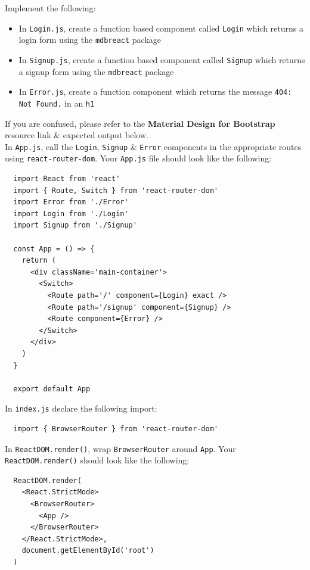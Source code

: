 \documentclass{article}
\begin{document}
Implement the following:
\begin{itemize}
  \item In \texttt{Login.js}, create a function based component called \texttt{Login} which returns a login form using the \texttt{mdbreact} package
  \item In \texttt{Signup.js}, create a function based component called \texttt{Signup} which returns a signup form using the \texttt{mdbreact} package
  \item In \texttt{Error.js}, create a function component which returns the message \texttt{404: Not Found.} in an \texttt{h1}
\end{itemize}

If you are confused, please refer to the \textbf{Material Design for Bootstrap} resource link \& expected output below. \\

In \texttt{App.js}, call the \texttt{Login}, \texttt{Signup} \& \texttt{Error} components in the appropriate routes using \texttt{react-router-dom}. Your \texttt{App.js} file should look like the following:

\begin{verbatim}
  import React from 'react'
  import { Route, Switch } from 'react-router-dom'
  import Error from './Error'
  import Login from './Login'
  import Signup from './Signup'
  
  const App = () => {
    return (
      <div className='main-container'>
        <Switch>
          <Route path='/' component={Login} exact />
          <Route path='/signup' component={Signup} />
          <Route component={Error} />
        </Switch>
      </div>
    )
  }
  
  export default App   
\end{verbatim}

In \texttt{index.js} declare the following import:

\begin{verbatim}
  import { BrowserRouter } from 'react-router-dom'
\end{verbatim}

In \texttt{ReactDOM.render()}, wrap \texttt{BrowserRouter} around \texttt{App}. Your \texttt{ReactDOM.render()} should look like the following:

\begin{verbatim}
  ReactDOM.render(
    <React.StrictMode>
      <BrowserRouter>
        <App />
      </BrowserRouter>
    </React.StrictMode>,
    document.getElementById('root')
  )
\end{verbatim}
\end{document}
